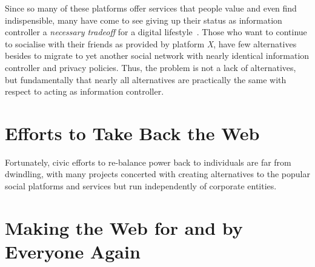 \documentclass{amsart}
\begin{document}

Since so many of these platforms offer services that people value and even find indispensible, many have come to see giving up their status as information controller a \emph{necessary tradeoff} for a digital lifestyle~\cite{}. Those who want to continue to socialise with their friends as provided by platform \emph{X}, have few alternatives besides to migrate to yet another social network with nearly identical information controller and privacy policies. Thus, the problem is not a lack of alternatives, but fundamentally that nearly all alternatives are practically the same with respect to acting as information controller.

\section{Efforts to Take Back the Web}

Fortunately, civic efforts to re-balance power back to individuals are far from dwindling, with many projects concerted with creating alternatives to the popular social platforms and services but run independently of corporate entities.  

\section{Making the Web for and by Everyone Again}





\end{document}
